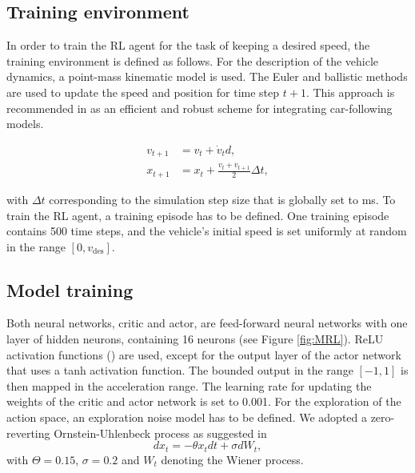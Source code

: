 \documentclass[review]{elsarticle}
\providecommand{\sub}[1]{_{\mathrm{#1}}}  %
\providecommand{\3}{{\ss}}
\begin{document}
	
	\subsection{Training environment}
	\label{training_environment1}
	In order to train the RL agent for the task of keeping a desired
	speed, the training environment is defined as follows. For the description of the vehicle dynamics, a point-mass kinematic model is used. The Euler and ballistic methods are used to update the speed and position for time step $t + 1$. This approach is recommended in \cite{numericalUpdateMethodsTreiber} as an efficient
	and robust scheme for integrating car-following models.
	
	\begin{align}
	v_{t+1} &= v_{t} + \dot{v}_{t} d, \\
	x_{t+1} &= x_{t} + \frac{v_{t} + v_{t+1}}{2} \Delta t,
	\end{align}
	
	
	with $\Delta t$ corresponding to the simulation step size that is globally
	set to \unit[100]{ms}. To train the RL agent, a training episode has to be defined. One training episode contains 500 time steps, and the vehicle's initial speed is set uniformly at random in the range $[0,v\sub{des}]$.
	
	\subsection{Model training}
	Both neural networks, critic and actor, are feed-forward neural
	networks with one layer of hidden neurons, containing 16 neurons (see
	Figure \ref{fig:MRL}). ReLU activation functions (\cite{relu}) are used, except for the output layer of the actor network that uses a tanh activation function. The bounded output in the range $[-1,1]$ is then mapped in the acceleration range. The learning rate for updating the weights of the critic and actor network is set to 0.001. For the exploration of the action space, an exploration noise model has to be defined. We adopted a
	zero-reverting Ornstein-Uhlenbeck process as suggested in \cite{DDPG}
	\begin{equation}
	d x_{t}=-\theta x_{t} d t+\sigma d W_{t},
	\end{equation}
	with $\Theta = 0.15$, $\sigma = 0.2$ and $W_{t}$ denoting the Wiener process.
	
\end{document}
